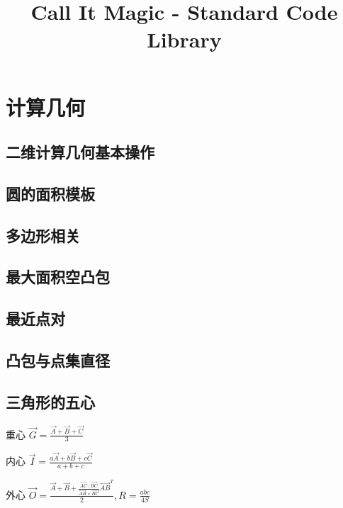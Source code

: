 \documentclass[10pt]{article}
\begin{document}
\title{Call It Magic - Standard Code Library}
\date{}
\tableofcontents
\newpage

\section{计算几何}

	\subsection{二维计算几何基本操作}
		
		
	\subsection{圆的面积模板}
		

	\subsection{多边形相关}
		

	\subsection{最大面积空凸包}
		

	\subsection{最近点对}
		

	\subsection{凸包与点集直径}
		

	\subsection{三角形的五心}
		重心 $\overrightarrow{G} = \frac{\overrightarrow{A} + \overrightarrow{B} + \overrightarrow{C}}{3}$

		内心 $\overrightarrow{I} = \frac{a\overrightarrow{A} + b\overrightarrow{B} + c\overrightarrow{C}}{a + b + c}$

		外心 $\overrightarrow{O} = \frac{\overrightarrow{A} + \overrightarrow{B} + \frac{\overrightarrow{AC} \cdot \overrightarrow{BC}}{\overrightarrow{AB} \times \overrightarrow{BC}} \overrightarrow{AB}^{T}}{2}, R = \frac{abc}{4S}$
\end{document}
